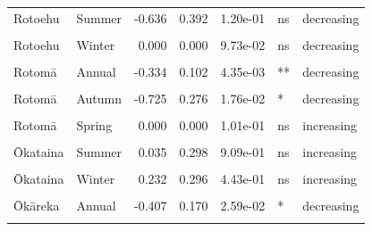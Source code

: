 \documentclass[
  12pt,
  a4paper,
  oneside]{scrbook}
\begin{document}
\begin{longtable}[t]{llrrrll}
Rotoehu & Summer & -0.636 & 0.392 & 1.20e-01 & ns & decreasing\\
\cellcolor{gray!8}{Rotoehu} & \cellcolor{gray!8}{Autumn} & \cellcolor{gray!8}{-0.125} & \cellcolor{gray!8}{0.085} & \cellcolor{gray!8}{1.58e-01} & \cellcolor{gray!8}{ns} & \cellcolor{gray!8}{decreasing}\\
Rotoehu & Winter & 0.000 & 0.000 & 9.73e-02 & ns & decreasing\\
\cellcolor{gray!8}{Rotoehu} & \cellcolor{gray!8}{Spring} & \cellcolor{gray!8}{-0.130} & \cellcolor{gray!8}{0.057} & \cellcolor{gray!8}{3.35e-02} & \cellcolor{gray!8}{*} & \cellcolor{gray!8}{decreasing}\\
\addlinespace
Rotomā & Annual & -0.334 & 0.102 & 4.35e-03 & ** & decreasing\\
\cellcolor{gray!8}{Rotomā} & \cellcolor{gray!8}{Summer} & \cellcolor{gray!8}{-0.532} & \cellcolor{gray!8}{0.223} & \cellcolor{gray!8}{2.88e-02} & \cellcolor{gray!8}{*} & \cellcolor{gray!8}{decreasing}\\
Rotomā & Autumn & -0.725 & 0.276 & 1.76e-02 & * & decreasing\\
\cellcolor{gray!8}{Rotomā} & \cellcolor{gray!8}{Winter} & \cellcolor{gray!8}{-0.095} & \cellcolor{gray!8}{0.187} & \cellcolor{gray!8}{6.19e-01} & \cellcolor{gray!8}{ns} & \cellcolor{gray!8}{decreasing}\\
Rotomā & Spring & 0.000 & 0.000 & 1.01e-01 & ns & increasing\\
\addlinespace
\cellcolor{gray!8}{Ōkataina} & \cellcolor{gray!8}{Annual} & \cellcolor{gray!8}{0.081} & \cellcolor{gray!8}{0.151} & \cellcolor{gray!8}{5.95e-01} & \cellcolor{gray!8}{ns} & \cellcolor{gray!8}{increasing}\\
Ōkataina & Summer & 0.035 & 0.298 & 9.09e-01 & ns & increasing\\
\cellcolor{gray!8}{Ōkataina} & \cellcolor{gray!8}{Autumn} & \cellcolor{gray!8}{0.336} & \cellcolor{gray!8}{0.310} & \cellcolor{gray!8}{2.91e-01} & \cellcolor{gray!8}{ns} & \cellcolor{gray!8}{increasing}\\
Ōkataina & Winter & 0.232 & 0.296 & 4.43e-01 & ns & increasing\\
\cellcolor{gray!8}{Ōkataina} & \cellcolor{gray!8}{Spring} & \cellcolor{gray!8}{-0.022} & \cellcolor{gray!8}{0.017} & \cellcolor{gray!8}{2.02e-01} & \cellcolor{gray!8}{ns} & \cellcolor{gray!8}{decreasing}\\
\addlinespace
Ōkāreka & Annual & -0.407 & 0.170 & 2.59e-02 & * & decreasing\\
\cellcolor{gray!8}{Ōkāreka} & \cellcolor{gray!8}{Summer} & \cellcolor{gray!8}{-1.297} & \cellcolor{gray!8}{0.268} & \cellcolor{gray!8}{8.57e-05} & \cellcolor{gray!8}{***} & \cellcolor{gray!8}{decreasing}\\

\end{longtable}
\end{document}
